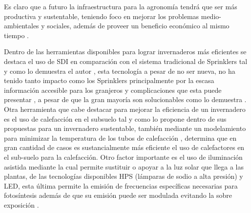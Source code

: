 \documentclass[letterpaper,conference]{IEEEtran}
\begin{document}



Es claro que a futuro la infraestructura para la agronomía tendrá que ser más productiva y sustentable, teniendo foco en mejorar los problemas medio-ambientales y sociales, además de proveer un beneficio económico al mismo tiempo \parencite{Specht2014}.







Dentro de las herramientas disponibles para lograr invernaderos más eficientes se destaca el uso de SDI en comparación con el sistema tradicional de Sprinklers tal y como lo demuestra el autor \parencite{Of2000}, esta tecnología a pesar de no ser nueva, no ha tenido tanto impacto como los Sprinklers principalmente por la escasa información accesible para los granjeros y complicaciones que esta puede presentar \parencite{Lamm2012}, a pesar de que la gran mayoría son solucionables como lo demuestra \parencite{Yu2010}. 
Otra herramienta que cabe destacar para mejorar la eficiencia de un invernadero es el uso de calefacción en el subsuelo tal y como lo propone \parencite{Cuce2016} dentro de sus propuestas para un invernadero sustentable, también mediante un modelamiento para minimizar la temperatura de los tubos de calefacción \parencite{Kurpaska2000}, determina que en gran cantidad de casos es sustancialmente más eficiente el uso de calefactores en el sub-suelo para la calefacción. 
Otro factor importante es el uso de iluminación asistida mediante la cual permite sustituir o apoyar a la luz solar que llega a las plantas, de las tecnologías disponibles HPS (lámparas de sodio a alta presión) y LED, esta última permite la emisión de frecuencias específicas necesarias para fotosíntesis además de que su emisión puede ser modulada evitando la sobre exposición \parencite{VanIersel2017}.
\end{document}
